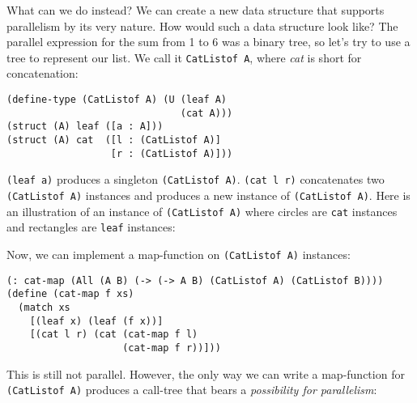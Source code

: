 \documentclass{article}
\begin{document}
What can we do instead? We can create a new data structure that supports parallelism by its very nature. How would such a data structure look like? The parallel expression for the sum from 1 to 6 was a binary tree, so let's try to use a tree to represent our list. We call it \lstinline{CatListof A}, where \emph{cat} is short for concatenation:

\begin{lstlisting}
(define-type (CatListof A) (U (leaf A)
                              (cat A)))
(struct (A) leaf ([a : A]))
(struct (A) cat  ([l : (CatListof A)]
                  [r : (CatListof A)]))
\end{lstlisting}

\lstinline{(leaf a)} produces a singleton \lstinline{(CatListof A)}. \lstinline{(cat l r)} concatenates two \lstinline{(CatListof A)} instances and produces a new instance of \lstinline{(CatListof A)}. Here is an illustration of an instance of \lstinline{(CatListof A)} where circles are \lstinline{cat} instances and rectangles are \lstinline{leaf} instances:

\begin{center}
\end{center}

Now, we can implement a map-function on \lstinline{(CatListof A)} instances:

\begin{lstlisting}
(: cat-map (All (A B) (-> (-> A B) (CatListof A) (CatListof B))))
(define (cat-map f xs)
  (match xs
    [(leaf x) (leaf (f x))]
    [(cat l r) (cat (cat-map f l)
                    (cat-map f r))]))
\end{lstlisting}

This is still not parallel. However, the only way we can write a map-function for \lstinline{(CatListof A)} produces a call-tree that bears a \emph{possibility for parallelism}:
\end{document}
